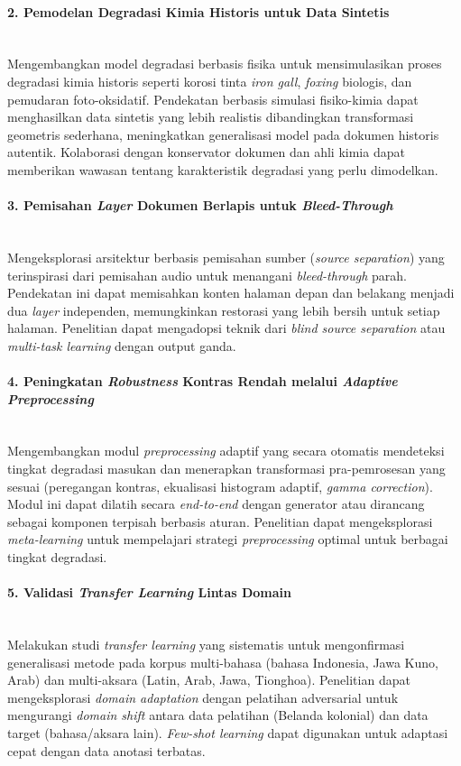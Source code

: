 \documentclass[12pt,a4paper]{article}
\begin{document}
\paragraph{2. Pemodelan Degradasi Kimia Historis untuk Data Sintetis} \mbox{}\\[0.1em]
Mengembangkan model degradasi berbasis fisika untuk mensimulasikan proses degradasi kimia historis seperti korosi tinta \textit{iron gall}, \textit{foxing} biologis, dan pemudaran foto-oksidatif. Pendekatan berbasis simulasi fisiko-kimia dapat menghasilkan data sintetis yang lebih realistis dibandingkan transformasi geometris sederhana, meningkatkan generalisasi model pada dokumen historis autentik. Kolaborasi dengan konservator dokumen dan ahli kimia dapat memberikan wawasan tentang karakteristik degradasi yang perlu dimodelkan.

\paragraph{3. Pemisahan \textit{Layer} Dokumen Berlapis untuk \textit{Bleed-Through}} \mbox{}\\[0.1em]
Mengeksplorasi arsitektur berbasis pemisahan sumber (\textit{source separation}) yang terinspirasi dari pemisahan audio untuk menangani \textit{bleed-through} parah. Pendekatan ini dapat memisahkan konten halaman depan dan belakang menjadi dua \textit{layer} independen, memungkinkan restorasi yang lebih bersih untuk setiap halaman. Penelitian dapat mengadopsi teknik dari \textit{blind source separation} atau \textit{multi-task learning} dengan output ganda.

\paragraph{4. Peningkatan \textit{Robustness} Kontras Rendah melalui \textit{Adaptive Preprocessing}} \mbox{}\\[0.1em]
Mengembangkan modul \textit{preprocessing} adaptif yang secara otomatis mendeteksi tingkat degradasi masukan dan menerapkan transformasi pra-pemrosesan yang sesuai (peregangan kontras, ekualisasi histogram adaptif, \textit{gamma correction}). Modul ini dapat dilatih secara \textit{end-to-end} dengan generator atau dirancang sebagai komponen terpisah berbasis aturan. Penelitian dapat mengeksplorasi \textit{meta-learning} untuk mempelajari strategi \textit{preprocessing} optimal untuk berbagai tingkat degradasi.

\paragraph{5. Validasi \textit{Transfer Learning} Lintas Domain} \mbox{}\\[0.1em]
Melakukan studi \textit{transfer learning} yang sistematis untuk mengonfirmasi generalisasi metode pada korpus multi-bahasa (bahasa Indonesia, Jawa Kuno, Arab) dan multi-aksara (Latin, Arab, Jawa, Tionghoa). Penelitian dapat mengeksplorasi \textit{domain adaptation} dengan \textnormal{pelatihan adversarial} untuk mengurangi \textit{domain shift} antara data pelatihan (Belanda kolonial) dan data target (bahasa/aksara lain). \textit{Few-shot learning} dapat digunakan untuk adaptasi cepat dengan data anotasi terbatas.
\end{document}

